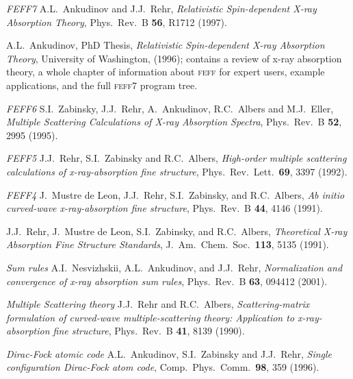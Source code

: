 \documentclass[11pt,oneside]{report} %
\newcommand{\program}[1]{\textsc{#1}}
\newcommand{\feff}{\program{feff}}
\begin{document}
\begin{latexonly}
\begin{Reflist}
\item [\textit{FEFF7}] A.L.\ Ankudinov and J.J.\ Rehr, \emph{Relativistic
    Spin-dependent X-ray Absorption Theory}, Phys.\ Rev.\ B \textbf{56},
  R1712 (1997).
 
  A.L.\ Ankudinov, PhD Thesis, \emph{Relativistic Spin-dependent
    X-ray Absorption Theory}, University of Washington, (1996); 
  contains a review of x-ray absorption theory, a whole chapter
  of information about {\feff} for expert users, example
  applications, and the full {\feff}7 program tree.
 
\item [\textit{FEFF6}] S.I.\ Zabinsky, J.J.\ Rehr, A.\ Ankudinov, R.C.\
  Albers and M.J.\ Eller, \emph{Multiple Scattering Calculations of
    X-ray Absorption Spectra}, Phys.\ Rev.\ B \textbf{52}, 2995 (1995).
 
\item [\textit{FEFF5}] J.J.\ Rehr, S.I.\ Zabinsky and R.C.\ Albers,
  \emph{High-order multiple scattering calculations of
    x-ray-absorption fine structure}, Phys.\ Rev.\ Lett.\ \textbf{69},
  3397 (1992).
  
\item [\textit{FEFF4}] J.\ Mustre de Leon, J.J.\ Rehr, S.I.\
  Zabinsky, and R.C.\ Albers, \emph{Ab initio curved-wave
    x-ray-absorption fine structure}, Phys.\ Rev.\ B \textbf{44}, 4146
  (1991).
 
 J.J.\ Rehr, J.\ Mustre de Leon, S.I.\ Zabinsky, and
  R.C.\ Albers, \emph{Theoretical X-ray Absorption Fine Structure
    Standards}, J.\ Am.\ Chem.\ Soc.\ \textbf{113}, 5135 (1991).
 
\item [\textit{Sum rules}]
A.I.\ Nesvizhskii, A.L.\ Ankudinov, and J.J.\ Rehr,
  \emph{Normalization and convergence of x-ray absorption sum
  rules}, Phys.\ Rev.\ B \textbf{63}, 094412 (2001).
 
\item [\textit{Multiple Scattering theory}] J.J.\ Rehr and R.C.\ Albers,
  \emph{Scattering-matrix formulation of curved-wave
    multiple-scattering theory: Application to x-ray-absorption fine
    structure}, Phys.\ Rev.\ B \textbf{41}, 8139 (1990).
 
\item [\textit{Dirac-Fock atomic code}] A.L.\ Ankudinov, S.I.\ Zabinsky and J.J.\
  Rehr, \emph{Single configuration Dirac-Fock atom code}, Comp.\ Phys.\
  Comm.\ \textbf{98}, 359 (1996).

\end{Reflist}



\end{latexonly}
\end{document}
